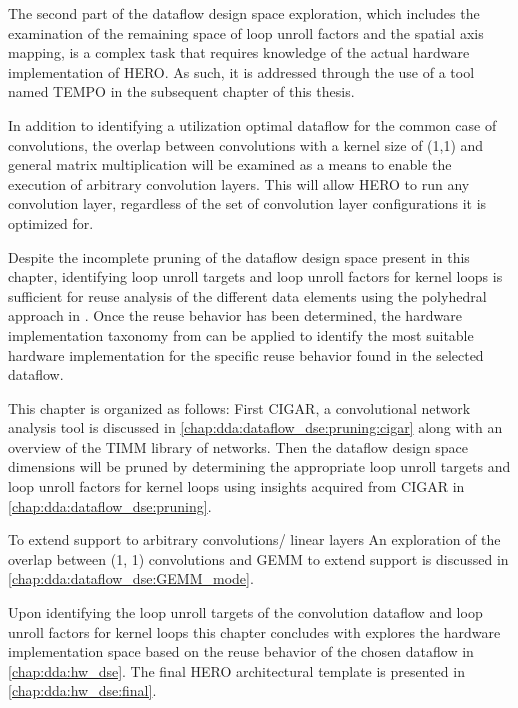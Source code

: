 The second part of the dataflow design
space exploration, which includes the examination of the remaining space of loop
unroll factors and the spatial axis mapping, is a complex task that requires
knowledge of the actual hardware implementation of HERO. As such, it is addressed through
the use of a tool named TEMPO in the subsequent chapter of this thesis.


In addition to identifying a utilization optimal dataflow for the common
case of convolutions, the overlap between convolutions with a kernel size of
(1,1) and general matrix multiplication will be examined as a means to enable
the execution of arbitrary convolution layers. This will allow HERO to run any
convolution layer, regardless of the set of convolution layer configurations it
is optimized for.

Despite the incomplete pruning of the dataflow design space present in this chapter, identifying loop
unroll targets and loop unroll factors for kernel loops is sufficient for reuse
analysis of the different data elements using the polyhedral approach in
\cite{meeus}. Once the reuse behavior has been determined, the hardware
implementation taxonomy from \cite{maestro} can be applied to identify the
most suitable hardware implementation for the specific reuse behavior found in
the selected dataflow.

This chapter is organized as follows: First CIGAR, a convolutional network analysis tool is discussed in
\autoref{chap:dda:dataflow_dse:pruning:cigar} along with an overview of the TIMM
library of networks. Then the dataflow design
space dimensions will be pruned by determining the
appropriate loop unroll targets and loop unroll factors for kernel loops using insights acquired
from \ac{CIGAR} in \autoref{chap:dda:dataflow_dse:pruning}.


To extend support to arbitrary convolutions/ linear layers An exploration of the overlap
between (1, 1) convolutions and GEMM to extend support is discussed in
\autoref{chap:dda:dataflow_dse:GEMM_mode}. 

Upon identifying the loop unroll targets of the convolution dataflow and loop
unroll factors for kernel loops this chapter concludes with explores the
hardware implementation space based on the reuse behavior of the chosen dataflow
in \autoref{chap:dda:hw_dse}. The final HERO
architectural template is presented in \autoref{chap:dda:hw_dse:final}.

